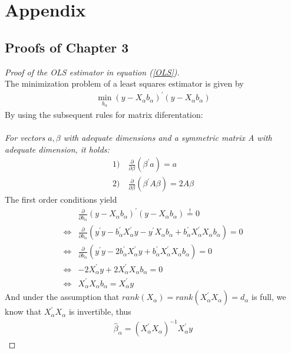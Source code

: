 \documentclass[Research_Module_ES.tex]{subfiles}
\begin{document}
\appendix
\section{Appendix}\label{AAppendix}

\subsection{Proofs of Chapter 3}
\begin{proof}[Proof of the OLS estimator in equation (\ref{OLS})]~\\
	The minimization problem of a least squares estimator is given by
	\begin{align*}
	\min_{b_\alpha}(y-X_\alpha b_\alpha)^\prime(y-X_\alpha b_\alpha)
	\end{align*}
	By using the subsequent rules for matrix diferentation:\\\\
	\textit{For vectors $a,\beta$ with adequate dimensions and a symmetric matrix A with adequate dimension, it holds:}
	\begin{align*}
	1)&~ \frac{\partial}{\partial \beta}(\beta^\prime a)=a\\
	2)&~\frac{\partial}{\partial \beta}(\beta^\prime A\beta)=2A\beta
	\end{align*}
	The first order conditions yield
	\begin{align*}
	& \frac{\partial}{\partial b_\alpha}(y-X_\alpha b_\alpha)^\prime(y-X_\alpha b_\alpha)\stackrel{!}{=}0\\
	\Leftrightarrow & \frac{\partial}{\partial b_\alpha}(y^\prime y-b_\alpha^\prime X_\alpha^\prime y-y^\prime X_\alpha b_\alpha+b_\alpha^\prime X_\alpha^\prime X_\alpha b_\alpha)=0\\
	\Leftrightarrow & \frac{\partial}{\partial b_\alpha}(y^\prime y-2b_\alpha^\prime X_\alpha^\prime y+b_\alpha^\prime X_\alpha^\prime X_\alpha b_\alpha)=0\\
	\Leftrightarrow & -2X_\alpha^\prime y +2 X_\alpha^\prime X_\alpha b_\alpha=0\\
	\Leftrightarrow & X_\alpha^\prime X_\alpha b_\alpha=X_\alpha^\prime y
	\end{align*}
	And under the assumption that $rank(X_\alpha)=rank(X_\alpha^\prime X_\alpha)=d_\alpha$ is full, we know that $X_\alpha^\prime X_\alpha$ is invertible, thus 
	\begin{align*}
	\hat{\beta}_\alpha=(X_\alpha^\prime X_\alpha)^{-1}X_\alpha^\prime y
	\end{align*}
\end{proof}
\end{document}
